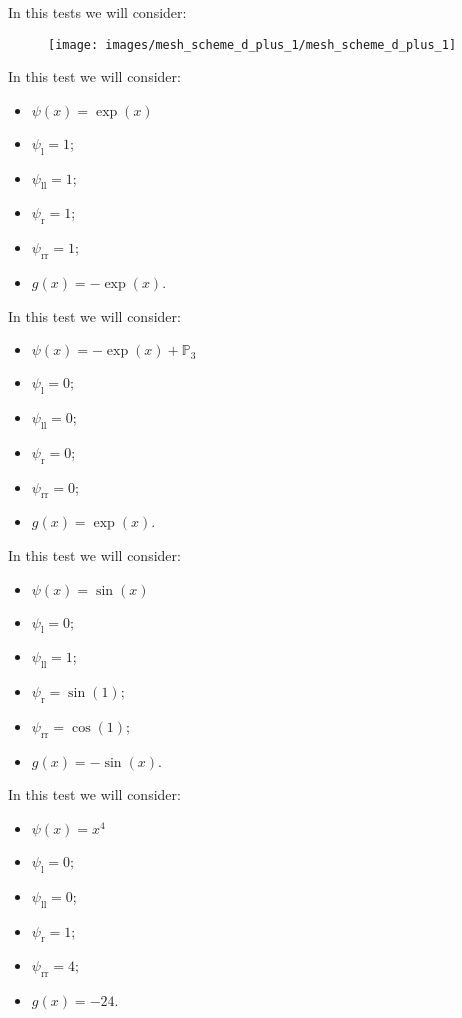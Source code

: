 \documentclass[12pt,a4paper]{article}
\author{Hélder Cruz}
\newcommand{\psil}{\psi_\text{l}}
\newcommand{\psill}{\psi_{\text{ll}}}
\newcommand{\psir}{\psi_\text{r}}
\newcommand{\psirr}{\psi_{\text{rr}}}
\begin{document}
In this tests we will consider:
\begin{figure}[h]
\centering
\texttt{[image: images/mesh\_scheme\_d\_plus\_1/mesh\_scheme\_d\_plus\_1]}
\end{figure}
\vspace{-0.5cm}
In this test we will consider:
\begin{itemize}
\item $\psi(x)=\exp(x)$
\item $\psil=1$;
\item $\psill=1$;
\item $\psir=1$;
\item $\psirr=1$;
\item $g(x)=-\exp(x)$.
\end{itemize}


\pagebreak
In this test we will consider:
\begin{itemize}
\item $\psi(x)=-\exp(x)+\mathbb{P}_3$
\item $\psil=0$;
\item $\psill=0$;
\item $\psir=0$;
\item $\psirr=0$;
\item $g(x)=\exp(x)$.
\end{itemize}

\pagebreak
In this test we will consider:
\begin{itemize}
\item $\psi(x)=\sin(x)$
\item $\psil=0$;
\item $\psill=1$;
\item $\psir=\sin(1)$;
\item $\psirr=\cos(1)$;
\item $g(x)=-\sin(x)$.
\end{itemize}

\pagebreak
In this test we will consider:
\begin{itemize}
\item $\psi(x)=x^4$
\item $\psil=0$;
\item $\psill=0$;
\item $\psir=1$;
\item $\psirr=4$;
\item $g(x)=-24$.
\end{itemize}


\end{document}
